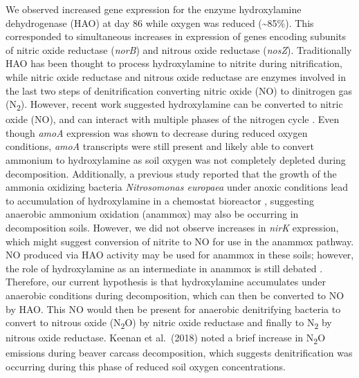 \documentclass[
  sn-nature,
  lineno, referee]{sn-jnl}
\begin{document}
We observed increased gene expression for the enzyme hydroxylamine
dehydrogenase (HAO) at day 86 while oxygen was reduced
(\textasciitilde85\%). This corresponded to simultaneous increases in
expression of genes encoding subunits of nitric oxide reductase
(\emph{norB}) and nitrous oxide reductase (\emph{nosZ}). Traditionally
HAO has been thought to process hydroxylamine to nitrite during
nitrification, while nitric oxide reductase and nitrous oxide reductase
are enzymes involved in the last two steps of denitrification converting
nitric oxide (NO) to dinitrogen gas (N\textsubscript{2}). However,
recent work suggested hydroxylamine can be converted to nitric oxide
(NO), and can interact with multiple phases of the nitrogen cycle
\citep{soler-jofra_hydroxylamine_2021}. Even though \emph{amoA}
expression was shown to decrease during reduced oxygen conditions,
\emph{amoA} transcripts were still present and likely able to convert
ammonium to hydroxylamine as soil oxygen was not completely depleted
during decomposition. Additionally, a previous study reported that the
growth of the ammonia oxidizing bacteria \emph{Nitrosomonas europaea}
under anoxic conditions lead to accumulation of hydroxylamine in a
chemostat bioreactor \citep{yu_nitrosomonas_2018}, suggesting anaerobic
ammonium oxidation (anammox) may also be occurring in decomposition
soils. However, we did not observe increases in \emph{nirK} expression,
which might suggest conversion of nitrite to NO for use in the anammox
pathway. NO produced via HAO activity may be used for anammox in these
soils; however, the role of hydroxylamine as an intermediate in anammox
is still debated \citep{soler-jofra_hydroxylamine_2021}. Therefore, our
current hypothesis is that hydroxylamine accumulates under anaerobic
conditions during decomposition, which can then be converted to NO by
HAO. This NO would then be present for anaerobic denitrifying bacteria
to convert to nitrous oxide (N\textsubscript{2}O) by nitric oxide
reductase and finally to N\textsubscript{2} by nitrous oxide reductase.
Keenan et al.~(2018) \citep{keenan_mortality_2018} noted a brief
increase in N\textsubscript{2}O emissions during beaver carcass
decomposition, which suggests denitrification was occurring during this
phase of reduced soil oxygen concentrations.
\end{document}
